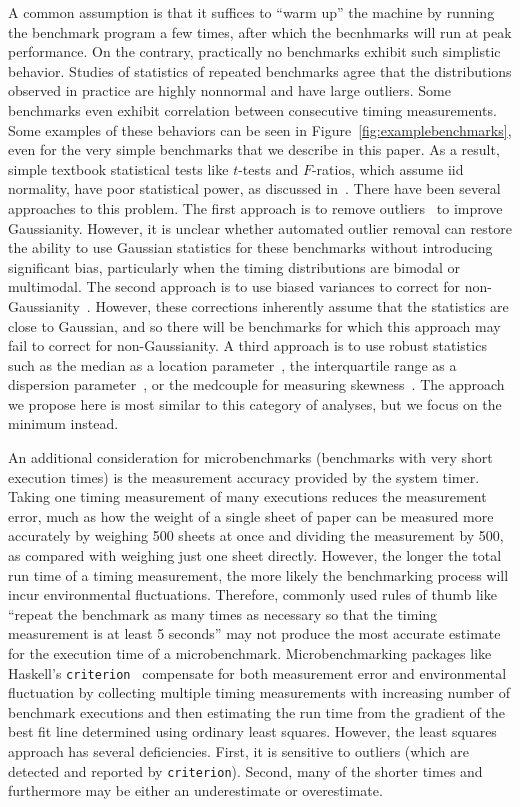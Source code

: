 \documentclass[conference]{IEEEtran}
\begin{document}
A common assumption is that it suffices to ``warm up'' the machine by running
the benchmark program a few times, after which the becnhmarks will run at peak performance.
On the contrary, practically no benchmarks exhibit such simplistic behavior.
Studies of statistics of repeated benchmarks agree that the distributions observed in practice are highly nonnormal and have large outliers. Some benchmarks even exhibit correlation between consecutive
timing measurements.
Some examples of these behaviors can be seen in Figure~\ref{fig:examplebenchmarks},
even for the very simple benchmarks that we describe in this paper.
As a result, simple textbook statistical tests like $t$-tests and $F$-ratios,
which assume iid normality, have poor statistical power, as discussed in~\cite{Mytkowicz2009,Kalibera2013,Chen2015,Barrett2016}.
There have been several approaches to this problem.
The first approach is to remove outliers~\cite{Rehn2015} to improve Gaussianity.
However, it is unclear whether automated outlier removal can restore the ability
to use Gaussian statistics for these benchmarks without introducing significant bias,
particularly when the timing distributions are bimodal or multimodal.
The second approach is to use biased variances to correct for non-Gaussianity~\cite{Mytkowicz2009}.
However, these corrections inherently assume that the statistics are close to Gaussian,
and so there will be benchmarks for which this approach may fail to correct for
non-Gaussianity.
A third approach is to use robust statistics such as the median as a location parameter~\cite{Mytkowicz2009}, the interquartile range as a dispersion parameter~\cite{Mytkowicz2009}, or the medcouple for measuring skewness~\cite{Rehn2015}. The approach we propose here is most similar to this
category of analyses, but we focus on the minimum instead.

An additional consideration for microbenchmarks (benchmarks with very short execution times)
is the measurement accuracy provided by the system timer.
Taking one timing measurement of many executions reduces the measurement error,
much as how the weight of a single sheet of paper can be measured more accurately
by weighing 500 sheets at once and dividing the measurement by 500,
as compared with weighing just one sheet directly.
However, the longer the total run time of a timing measurement, the more likely
the benchmarking process will incur environmental fluctuations.
Therefore, commonly used rules of thumb like
``repeat the benchmark as many times as necessary so that the timing measurement
is at least 5 seconds'' may not produce the most accurate estimate for the
execution time of a microbenchmark.
Microbenchmarking packages like Haskell's \lstinline|criterion|~\cite{criterion}
compensate for both measurement error and environmental fluctuation
by collecting multiple timing measurements with increasing number of benchmark
executions and then estimating the run time from the gradient of the best fit
line determined using ordinary least squares. However, the least squares approach
has several deficiencies. First, it is sensitive to outliers (which are detected and
reported by \lstinline|criterion|). Second, many of the shorter times
and furthermore may be either an underestimate or overestimate.
\end{document}
